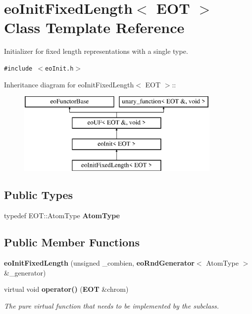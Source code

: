 \section{eo\-Init\-Fixed\-Length$<$ EOT $>$ Class Template Reference}
\label{classeo_init_fixed_length}
Initializer for fixed length representations with a single type.  


{\tt \#include $<$eo\-Init.h$>$}

Inheritance diagram for eo\-Init\-Fixed\-Length$<$ EOT $>$::\begin{figure}[H]
\begin{center}
\leavevmode
\includegraphics[height=4cm]{classeo_init_fixed_length}
\end{center}
\end{figure}
\subsection*{Public Types}
\begin{CompactItemize}
\item 
typedef EOT::Atom\-Type {\bf Atom\-Type}\label{classeo_init_fixed_length_w0}

\end{CompactItemize}
\subsection*{Public Member Functions}
\begin{CompactItemize}
\item 
{\bf eo\-Init\-Fixed\-Length} (unsigned \_\-combien, {\bf eo\-Rnd\-Generator}$<$ Atom\-Type $>$ \&\_\-generator)\label{classeo_init_fixed_length_a0}

\item 
virtual void {\bf operator()} ({\bf EOT} \&chrom)\label{classeo_init_fixed_length_a1}

\begin{CompactList}\small\item\em The pure virtual function that needs to be implemented by the subclass. \item\end{CompactList}\end{CompactItemize}
